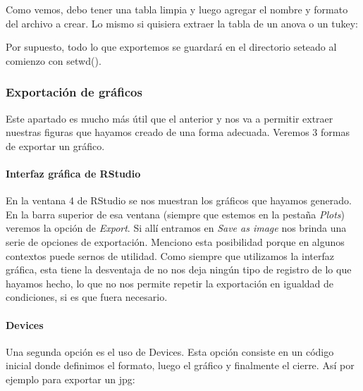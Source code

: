 \documentclass[
]{article}
\newenvironment{Shaded}{\begin{snugshade}}{\end{snugshade}}
\newcommand{\FunctionTok}[1]{\textcolor[rgb]{0.13,0.29,0.53}{\textbf{#1}}}
\newcommand{\NormalTok}[1]{#1}
\newcommand{\SpecialCharTok}[1]{\textcolor[rgb]{0.81,0.36,0.00}{\textbf{#1}}}
\newcommand{\StringTok}[1]{\textcolor[rgb]{0.31,0.60,0.02}{#1}}
\begin{document}
Como vemos, debo tener una tabla limpia y luego agregar el nombre y
formato del archivo a crear. Lo mismo si quisiera extraer la tabla de un
anova o un tukey:

\begin{Shaded}
\end{Shaded}

Por supuesto, todo lo que exportemos se guardará en el directorio
seteado al comienzo con setwd().

\subsubsection{Exportación de
gráficos}\label{exportaciuxf3n-de-gruxe1ficos}

Este apartado es mucho más útil que el anterior y nos va a permitir
extraer nuestras figuras que hayamos creado de una forma adecuada.
Veremos 3 formas de exportar un gráfico.

\paragraph{Interfaz gráfica de
RStudio}\label{interfaz-gruxe1fica-de-rstudio}

En la ventana 4 de RStudio se nos muestran los gráficos que hayamos
generado. En la barra superior de esa ventana (siempre que estemos en la
pestaña \emph{Plots}) veremos la opción de \emph{Export}. Si allí
entramos en \emph{Save as image} nos brinda una serie de opciones de
exportación. Menciono esta posibilidad porque en algunos contextos puede
sernos de utilidad. Como siempre que utilizamos la interfaz gráfica,
esta tiene la desventaja de no nos deja ningún tipo de registro de lo
que hayamos hecho, lo que no nos permite repetir la exportación en
igualdad de condiciones, si es que fuera necesario.

\paragraph{Devices}\label{devices}

Una segunda opción es el uso de Devices. Esta opción consiste en un
código inicial donde definimos el formato, luego el gráfico y finalmente
el cierre. Así por ejemplo para exportar un jpg:
\end{document}
